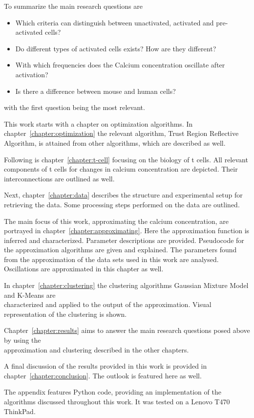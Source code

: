 To summarize the main research questions are
\begin{itemize}
	\item Which criteria can distinguish between unactivated, activated and pre-activated cells?
	\item Do different types of activated cells exists? How are they different?
	\item With which frequencies does the Calcium concentration oscillate after activation?
	\item Is there a difference between mouse and human cells?
\end{itemize}

with the first question being the most relevant.

\newpage
\noindent
This work starts with a chapter on optimization algorithms. In chapter~\ref{chapter:optimization} the relevant algorithm, Trust Region Reflective Algorithm, is attained from other algorithms, which are described as well.

Following is chapter~\ref{chapter:t-cell} focusing on the biology of t cells. All relevant components of t cells for changes in calcium concentration are depicted. Their interconnections are outlined as well.

Next, chapter~\ref{chapter:data} describes the structure and experimental setup for retrieving the data. Some processing steps performed on the data are outlined.

The main focus of this work, approximating the calcium concentration, are portrayed in chapter~\ref{chapter:approximating}. Here the approximation function is inferred and characterized. Parameter descriptions are provided. Pseudocode for the approximation algorithms are given and explained. The parameters found from the approximation of the data sets used in this work are analysed. Oscillations are approximated in this chapter as well.

In chapter~\ref{chapter:clustering} the clustering algorithms Gaussian Mixture Model and K-Means are\\ characterized and applied to the output of the approximation. Visual representation of the clustering is shown.

Chapter~\ref{chapter:results} aims to answer the main research questions posed above by using the\\ approximation and clustering described in the other chapters.

A final discussion of the results provided in this work is provided in chapter~\ref{chapter:conclusion}. The outlook is featured here as well.

The appendix features Python code, providing an implementation of the algorithms discussed throughout this work. It was tested on a Lenovo T470 ThinkPad.